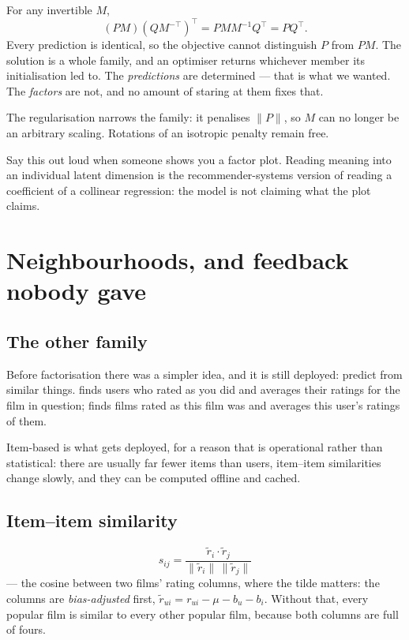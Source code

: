 \documentclass[11pt,a4paper]{article}
\begin{document}
\begin{derivbox}[title={The rotation nobody can see}]
For any invertible $M$,
\[ (PM)(QM^{-\top})^{\top} = PMM^{-1}Q^{\top} = PQ^{\top} . \]
Every prediction is identical, so the objective cannot distinguish $P$ from
$PM$. The solution is a whole family, and an optimiser returns whichever member
its initialisation led to. The \emph{predictions} are determined --- that is
what we wanted. The \emph{factors} are not, and no amount of staring at them
fixes that.

The regularisation narrows the family: it penalises $\|P\|$, so $M$ can no
longer be an arbitrary scaling. Rotations of an isotropic penalty remain free.
\end{derivbox}

Say this out loud when someone shows you a factor plot. Reading meaning into an
individual latent dimension is the recommender-systems version of reading a
coefficient of a collinear regression: the model is not claiming what the plot
claims.

\section{Neighbourhoods, and feedback nobody gave}

\subsection{The other family}

Before factorisation there was a simpler idea, and it is still deployed:
predict from similar things.  finds users who rated as you did
and averages their ratings for the film in question;  finds
films rated as this film was and averages this user's ratings of them.

Item-based is what gets deployed, for a reason that is operational rather than
statistical: there are usually far fewer items than users, item--item
similarities change slowly, and they can be computed offline and cached.

\subsection{Item--item similarity}

\[
  s_{ij} = \frac{\tilde r_i \cdot \tilde r_j}{\|\tilde r_i\|\,\|\tilde r_j\|}
\]
--- the cosine between two films' rating columns, where the tilde matters: the
columns are \emph{bias-adjusted} first,
$\tilde r_{ui} = r_{ui} - \mu - b_u - b_i$. Without that, every popular film is
similar to every other popular film, because both columns are full of fours.
\end{document}
